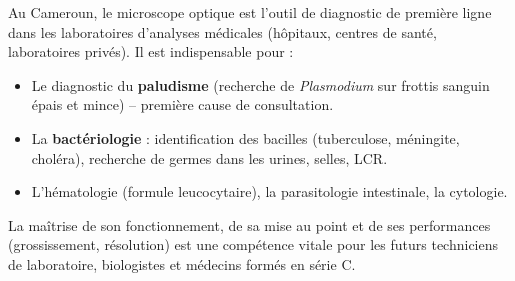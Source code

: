 \documentclass[11pt]{article}
\begin{document}
\begin{savaistu}
Au Cameroun, le microscope optique est l'outil de diagnostic de première ligne dans les laboratoires d'analyses médicales (hôpitaux, centres de santé, laboratoires privés). Il est indispensable pour :
\begin{itemize}
    \item Le diagnostic du \textbf{paludisme} (recherche de \emph{Plasmodium} sur frottis sanguin épais et mince) -- première cause de consultation.
    \item La \textbf{bactériologie} : identification des bacilles (tuberculose, méningite, choléra), recherche de germes dans les urines, selles, LCR.
    \item L'hématologie (formule leucocytaire), la parasitologie intestinale, la cytologie.
\end{itemize}
La maîtrise de son fonctionnement, de sa mise au point et de ses performances (grossissement, résolution) est une compétence vitale pour les futurs techniciens de laboratoire, biologistes et médecins formés en série C.
\end{savaistu}
\end{document}
